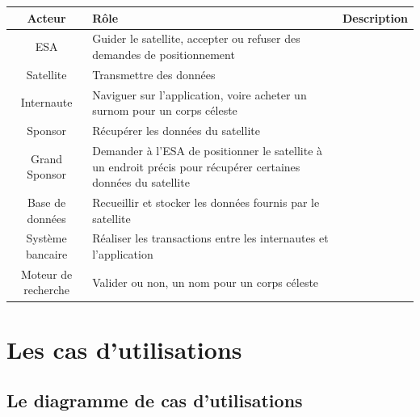 \documentclass[11pt,a4paper]{article}
\begin{document}
\begin{tabularx}{\linewidth}{|c|X|}
    \hline
    \textbf{Acteur} & \textbf{R\^ole} & \textbf{Description} \\
    \hline
    
    ESA & Guider le satellite, accepter ou refuser des demandes de
    positionnement\\
    
    \hline
    
    Satellite & Transmettre des donn\'ees \\
    
    \hline
    
    Internaute & Naviguer sur l'application, voire acheter un
    surnom pour un corps c\'eleste \\
    
    \hline
    
    Sponsor & R\'ecup\'erer les donn\'ees du satellite \\
    
    \hline
    
    Grand Sponsor & Demander \`a l'ESA de positionner le satellite
    \`a un endroit pr\'ecis pour r\'ecup\'erer certaines donn\'ees du
    satellite \\
    
    \hline
    
    Base de donn\'ees & Recueillir et stocker les donn\'ees fournis
    par le satellite \\
    
    \hline
    
    Syst\`eme bancaire & R\'ealiser les transactions entre les
    internautes et l'application \\
    
    \hline
    
    Moteur de recherche & Valider ou non, un nom pour un corps 
    c\'eleste \\
    \hline

\end{tabularx}



\newpage


\section{Les cas d’utilisations}

\subsection{Le diagramme de cas d’utilisations}
\end{document}
